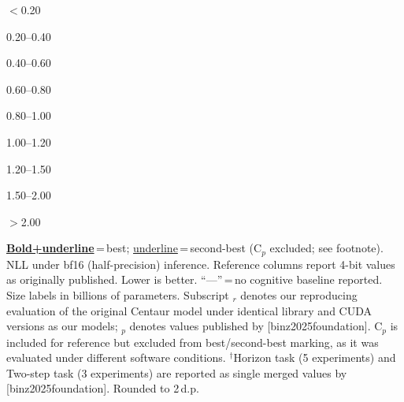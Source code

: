\documentclass{article}
\providecommand{\citet}[1]{[#1]}
\newlength{\ctrtblwd}
\begin{document}
\begin{table}
\begin{minipage}{\ctrtblwd}
\vspace{4pt}
\begin{center}\footnotesize
\colorbox{c1!45}{\strut\hspace{5pt}} \scriptsize$<$0.20 \quad
\colorbox{c2!40}{\strut\hspace{5pt}} \scriptsize 0.20--0.40 \quad
\colorbox{c3!40}{\strut\hspace{5pt}} \scriptsize 0.40--0.60 \quad
\colorbox{c4!45}{\strut\hspace{5pt}} \scriptsize 0.60--0.80 \quad
\colorbox{c5!55}{\strut\hspace{5pt}} \scriptsize 0.80--1.00 \quad
\colorbox{c6!50}{\strut\hspace{5pt}} \scriptsize 1.00--1.20 \quad
\colorbox{c7!45}{\strut\hspace{5pt}} \scriptsize 1.20--1.50 \quad
\colorbox{c8!40}{\strut\hspace{5pt}} \scriptsize 1.50--2.00 \quad
\colorbox{c9!35}{\strut\hspace{5pt}} \scriptsize$>$2.00
\end{center}
\vspace{-2pt}
{\tiny \underline{\textbf{Bold+underline}}\,=\,best; \underline{underline}\,=\,second-best (C$_p$ excluded; see footnote). NLL under bf16 (half-precision) inference. Reference columns report 4-bit values as originally published. Lower is better. ``---''\,=\,no cognitive baseline reported. Size labels in billions of parameters. Subscript $_r$ denotes our reproducing evaluation of the original Centaur model under identical library and CUDA versions as our models; $_p$ denotes values published by \citet{binz2025foundation}. C$_p$ is included for reference but excluded from best/second-best marking, as it was evaluated under different software conditions. $^\dagger$Horizon task (5 experiments) and Two-step task (3 experiments) are reported as single merged values by \citet{binz2025foundation}. Rounded to 2\,d.p.}
\end{minipage}
\captionsetup{width=\ctrtblwd}
\caption{Base vs.\ finetuned NLL on Psych-101 under bf16 inference, continued. Within each model size, the left column (base) shows the pretrained model and the right column (ft) the cognitively finetuned variant.}
\label{tab:heatmap_baseft_bf16_cont}
\end{table}
\end{document}
